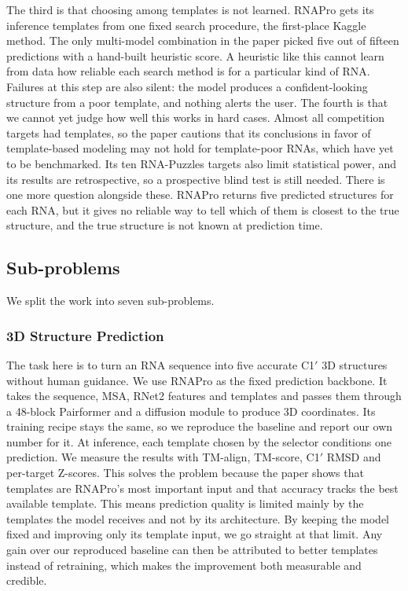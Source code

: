 \documentclass{FastFyp}
\begin{document}
The third is that choosing among templates is not learned. RNAPro gets its inference templates from one fixed search procedure, the first-place Kaggle method. The only multi-model combination in the paper picked five out of fifteen predictions with a hand-built heuristic score. A heuristic like this cannot learn from data how reliable each search method is for a particular kind of RNA. Failures at this step are also silent: the model produces a confident-looking structure from a poor template, and nothing alerts the user. The fourth is that we cannot yet judge how well this works in hard cases. Almost all competition targets had templates, so the paper cautions that its conclusions in favor of template-based modeling may not hold for template-poor RNAs, which have yet to be benchmarked. Its ten RNA-Puzzles targets also limit statistical power, and its results are retrospective, so a prospective blind test is still needed. There is one more question alongside these. RNAPro returns five predicted structures for each RNA, but it gives no reliable way to tell which of them is closest to the true structure, and the true structure is not known at prediction time.

\subsection{Sub-problems}
We split the work into seven sub-problems.

\subsubsection{3D Structure Prediction}
The task here is to turn an RNA sequence into five accurate C1$'$ 3D structures without human guidance. We use RNAPro as the fixed prediction backbone. It takes the sequence, MSA, RNet2 features and templates and passes them through a 48-block Pairformer and a diffusion module to produce 3D coordinates. Its training recipe stays the same, so we reproduce the baseline and report our own number for it. At inference, each template chosen by the selector conditions one prediction. We measure the results with TM-align, TM-score, C1$'$ RMSD and per-target Z-scores. This solves the problem because the paper shows that templates are RNAPro's most important input and that accuracy tracks the best available template. This means prediction quality is limited mainly by the templates the model receives and not by its architecture. By keeping the model fixed and improving only its template input, we go straight at that limit. Any gain over our reproduced baseline can then be attributed to better templates instead of retraining, which makes the improvement both measurable and credible.
\end{document}
